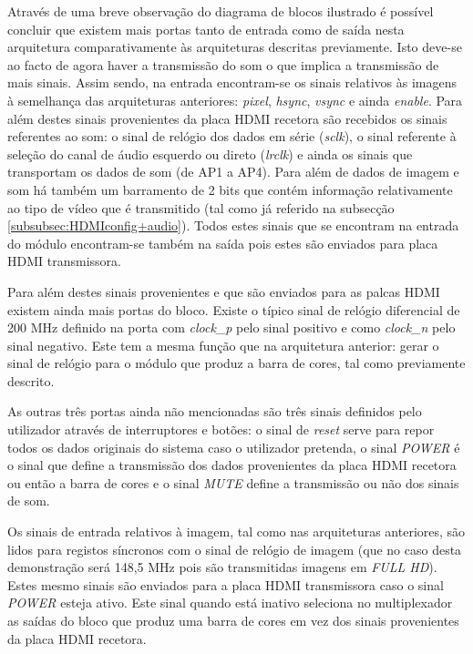 Através de uma breve observação do diagrama de blocos ilustrado é possível concluir que existem mais portas tanto de entrada como de saída nesta arquitetura comparativamente às arquiteturas descritas previamente. Isto deve-se ao facto de agora haver a transmissão do som o que implica a transmissão de mais sinais. Assim sendo, na entrada encontram-se os sinais relativos às imagens à semelhança das arquiteturas anteriores: \textit{pixel}, \textit{hsync}, \textit{vsync} e ainda \textit{enable}. Para além destes sinais provenientes da placa HDMI recetora são recebidos os sinais referentes ao som: o sinal de relógio dos dados em série (\textit{sclk}), o sinal referente à seleção do canal de áudio esquerdo ou direto (\textit{lrclk}) e ainda os sinais que transportam os dados de som (de AP1 a AP4). Para além de dados de imagem e som há também um barramento de 2 bits que contém informação relativamente ao tipo de vídeo que é transmitido (tal como já referido na subsecção \ref{subsubsec:HDMIconfig+audio}). Todos estes sinais que se encontram na entrada do módulo encontram-se também na saída pois estes são enviados para placa HDMI transmissora.

Para além destes sinais provenientes e que são enviados para as palcas HDMI existem ainda mais portas do bloco. Existe o típico sinal de relógio diferencial de 200 MHz definido na porta com \textit{clock\_p} pelo sinal positivo e como \textit{clock\_n} pelo sinal negativo. Este tem a mesma função que na arquitetura anterior: gerar o sinal de relógio para o módulo que produz a barra de cores, tal como previamente descrito. 

As outras três portas ainda não mencionadas são três sinais definidos pelo utilizador através de interruptores e botões: o sinal de \textit{reset} serve para repor todos os dados originais do sistema caso o utilizador pretenda, o sinal \textit{POWER} é o sinal que define a transmissão dos dados provenientes da placa HDMI recetora ou então a barra de cores e o sinal \textit{MUTE} define a transmissão ou não dos sinais de som.


Os sinais de entrada relativos à imagem, tal como nas arquiteturas anteriores, são lidos para registos síncronos com o sinal de relógio de imagem (que no caso desta demonstração será 148,5 MHz pois são transmitidas imagens em \textit{FULL HD}). Estes mesmo sinais são enviados para a placa HDMI transmissora caso o sinal \textit{POWER} esteja ativo. Este sinal quando está inativo seleciona no multiplexador as saídas do bloco que produz uma barra de cores em vez dos sinais provenientes da placa HDMI recetora.

